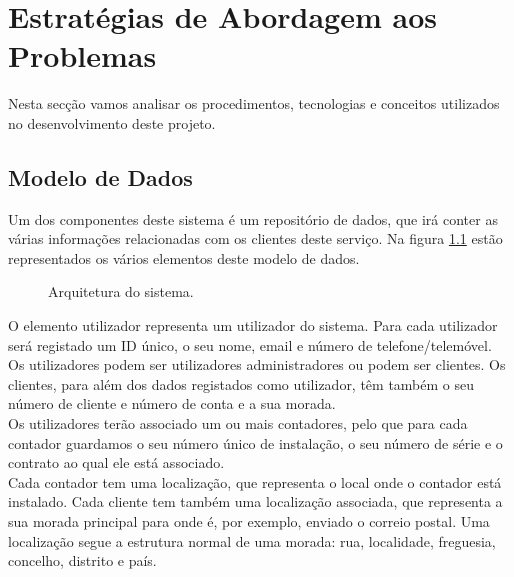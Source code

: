 \chapter{Estratégias de Abordagem aos Problemas} \label{cap:abordagem}
Nesta secção vamos analisar os procedimentos, tecnologias e conceitos utilizados no desenvolvimento deste projeto.

\section{Modelo de Dados} \label{sec:dados}
Um dos componentes deste sistema é um repositório de dados, que irá conter as várias informações relacionadas com os clientes deste serviço. Na figura \ref{fig:relacoes} estão representados os vários elementos deste modelo de dados. \\

\begin{figure}[ht!]
\centering
{}
\caption{Arquitetura do sistema.}
\label{fig:relacoes}
\end{figure}

O elemento utilizador representa um utilizador do sistema. Para cada utilizador será registado um ID único, o seu nome, email e número de telefone/telemóvel. Os utilizadores podem ser utilizadores administradores ou podem ser clientes. Os clientes, para além dos dados registados como utilizador, têm também o seu número de cliente e número de conta e a sua morada. \\
Os utilizadores terão associado um ou mais contadores, pelo que para cada contador guardamos o seu número único de instalação, o seu número de série e o contrato ao qual ele está associado. \\
Cada contador tem uma localização, que representa o local onde o contador está instalado. Cada cliente tem também uma localização associada, que representa a sua morada principal para onde é, por exemplo, enviado o correio postal. Uma localização segue a estrutura normal de uma morada: rua, localidade, freguesia, concelho, distrito e país.


